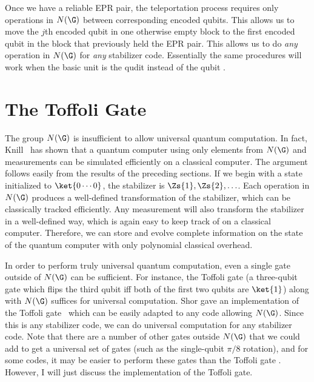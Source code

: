 Once we have a reliable EPR pair, the teleportation process requires only
operations in $N(\G)$ between corresponding encoded qubits.  This allows us to
move the $j$th encoded qubit in one otherwise empty block to the first encoded
qubit in the block that previously held the EPR pair.  This allows us to do
	{\em any} operation in $N(\G)$ for {\em any} stabilizer code.  Essentially
the same procedures will work when the basic unit is the qudit instead of
the qubit \cite{gottesman-qudit}.

\section{The Toffoli Gate}
\label{sec-toffoli}

The group $N(\G)$ is insufficient to allow universal quantum computation.
In fact, Knill~\cite{knill-normalizer} has shown that a quantum computer
using only elements from $N(\G)$ and measurements can be simulated
efficiently on a classical computer.  The argument follows easily from the
results of the preceding sections.  If we begin with a state initialized to
$\ket{0\cdots0}$, the stabilizer is $\Zs{1}, \Zs{2}, \ldots$.  Each operation
in $N(\G)$ produces a well-defined transformation of the stabilizer, which
can be classically tracked efficiently.  Any measurement will also
transform the stabilizer in a well-defined way, which is again easy to keep
track of on a classical computer.  Therefore, we can store and evolve
complete information on the state of the quantum computer with only
polynomial classical overhead.

In order to perform truly universal quantum computation, even a single
gate outside of $N(\G)$ can be sufficient.  For instance, the Toffoli gate (a
three-qubit gate which flips the third qubit iff both of the first two qubits
are $\ket{1}$) along with $N(\G)$ suffices for universal computation.  Shor
gave an implementation of the Toffoli gate~\cite{shor-fault-tol} which can
be easily adapted to any code allowing $N(\G)$.  Since this is any stabilizer
code, we can do universal computation for any stabilizer code.  Note that
there are a number of other gates outside $N(\G)$ that we could add to get
a universal set of gates (such as the single-qubit $\pi/8$ rotation), and
for some codes, it may be easier to perform these gates than the Toffoli
gate \cite{knill-concatenate2}.  However, I will just discuss the
implementation of the Toffoli gate.

